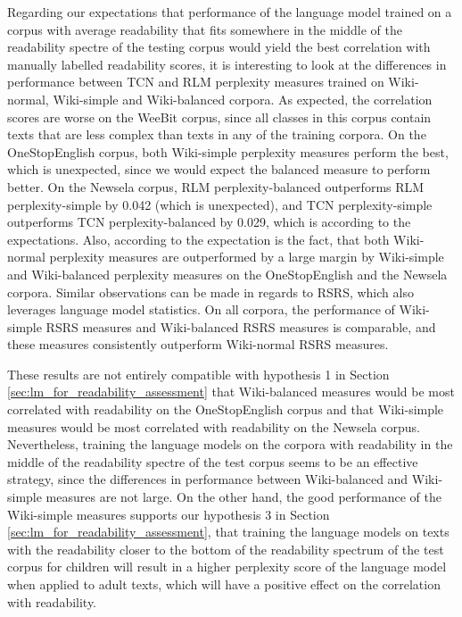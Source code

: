 \documentclass{clv3}
\begin{document}
Regarding our expectations that performance of the language model trained on a corpus with average readability that fits somewhere in the middle of the readability spectre of the testing corpus would yield the best correlation with manually labelled readability scores, it is interesting to look at the differences in performance between TCN and RLM perplexity measures trained on Wiki-normal, Wiki-simple and Wiki-balanced corpora. As expected, the correlation scores are worse on the WeeBit corpus, since all classes in this corpus contain texts that are less complex than texts in any of the training corpora. On the OneStopEnglish corpus, both Wiki-simple perplexity measures perform the best, which is unexpected, since we would expect the balanced measure to perform better. On the Newsela corpus, RLM perplexity-balanced outperforms RLM perplexity-simple by 0.042 (which is unexpected), and TCN perplexity-simple outperforms TCN perplexity-balanced by 0.029, which is according to the expectations. Also, according to the expectation is the fact, that both Wiki-normal perplexity measures are outperformed by a large margin by Wiki-simple and Wiki-balanced perplexity measures on the OneStopEnglish and the Newsela corpora. Similar observations can be made in regards to RSRS, which also leverages language model statistics. On all corpora, the performance of Wiki-simple RSRS measures and Wiki-balanced RSRS measures is comparable, and these measures consistently outperform Wiki-normal RSRS measures. 

These results are not entirely compatible with hypothesis 1 in Section \ref{sec:lm_for_readability_assessment} that Wiki-balanced measures would be most correlated with readability on the OneStopEnglish corpus and that Wiki-simple measures would be most correlated with readability on the Newsela corpus. Nevertheless, training the language models on the corpora with readability in the middle of the readability spectre of the test corpus seems to be an effective strategy, since the differences in performance between Wiki-balanced and Wiki-simple measures are not large. On the other hand, the good performance of the Wiki-simple measures supports our hypothesis 3 in Section \ref{sec:lm_for_readability_assessment}, that training the language models on texts with the readability closer to the bottom of the readability spectrum of the test corpus for children will result in a higher perplexity score of the language model when applied to adult texts, which will have a positive effect on the correlation with readability. 
\end{document}
